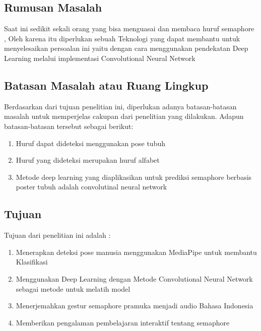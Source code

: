 \subsection{Rumusan Masalah}

Saat ini sedikit sekali orang yang bisa menguasai dan membaca huruf semaphore , Oleh karena itu diperlukan sebuah Teknologi yang dapat membantu untuk menyelesaikan persoalan ini yaitu dengan cara menggunakan pendekatan Deep Learning melalui implementasi Convolutional Neural Network


\subsection{Batasan Masalah atau Ruang Lingkup}

Berdasarkan dari tujuan penelitian ini, diperlukan adanya batasan-batasan masalah untuk memperjelas cakupan dari penelitian yang dilakukan. Adapun batasan-batasan tersebut sebagai berikut:

\begin{enumerate}
\item Huruf dapat dideteksi menggunakan pose tubuh
\item Huruf yang dideteksi merupakan huruf alfabet 
\item Metode deep learning yang diaplikasikan untuk prediksi semaphore berbasis poster tubuh adalah convolutinal neural network
\end{enumerate}


\subsection{Tujuan}




Tujuan dari penelitian ini adalah :

\begin{enumerate}   
\item	Menerapkan deteksi pose manusia menggunakan MediaPipe untuk membantu Klasifikasi 
\item   Menggunakan Deep Learning dengan Metode Convolutional Neural Network sebagai metode untuk melatih model
\item	Menerjemahkan gestur semaphore pramuka menjadi audio Bahasa Indonesia
\item	Memberikan pengalaman pembelajaran interaktif tentang semaphore
\end{enumerate}


